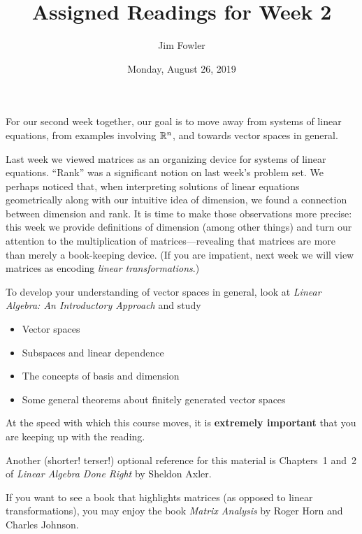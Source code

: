 \documentclass{homework}
\author{Jim Fowler}
\title{Assigned Readings for Week 2}
\date{Monday, August 26, 2019}
\begin{document}
\maketitle

For our second week together, our goal is to move away from systems of
linear equations, from examples involving $\mathbb{R}^n$, and towards vector
spaces in general.

Last week we viewed matrices as an organizing device for systems of
linear equations.  ``Rank'' was a significant notion on last week's
problem set.  We perhaps noticed that, when interpreting solutions of
linear equations geometrically along with our intuitive idea of
dimension, we found a connection between dimension and rank.  It is
time to make those observations more precise: this week we provide
definitions of dimension (among other things) and turn our attention
to the multiplication of matrices---revealing that matrices are more
than merely a book-keeping device.  (If you are impatient, next week
we will view matrices as encoding \textit{linear transformations}.)

To develop your understanding of vector spaces in general, look at
\textit{Linear Algebra: An Introductory Approach} and study
\begin{itemize}
\item {} Vector spaces
\item {} Subspaces and linear dependence
\item {} The concepts of basis and dimension
\item {} Some general theorems about finitely generated vector spaces
\end{itemize}
At the speed with which this course moves, it is \textbf{extremely
  important} that you are keeping up with the reading.

Another (shorter!  terser!) optional reference for this material is
Chapters~1 and~2 of \textit{Linear Algebra Done Right} by Sheldon
Axler.

If you want to see a book that highlights matrices (as opposed to
linear transformations), you may enjoy the book \textit{Matrix
  Analysis} by Roger Horn and Charles Johnson.
\end{document}
